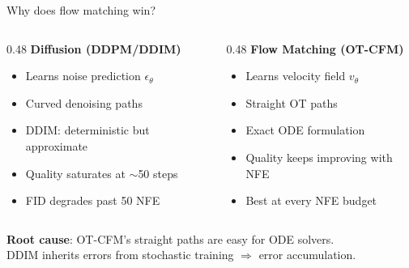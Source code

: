 \documentclass[aspectratio=169,10pt]{beamer}
\begin{document}
\begin{frame}{Why does flow matching win?}
\begin{columns}[T]
\begin{column}{0.48\textwidth}
\textbf{\textcolor{ddpmred}{Diffusion (DDPM/DDIM)}}
\begin{itemize}
    \item Learns noise prediction $\epsilon_\theta$
    \item Curved denoising paths
    \item DDIM: deterministic but approximate
    \item Quality saturates at $\sim$50 steps
    \item \alert{FID degrades past 50 NFE}
\end{itemize}
\end{column}
\begin{column}{0.48\textwidth}
\textbf{\textcolor{cfmblue}{Flow Matching (OT-CFM)}}
\begin{itemize}
    \item Learns velocity field $v_\theta$
    \item \textcolor{cfmblue}{Straight OT paths}
    \item Exact ODE formulation
    \item Quality \textcolor{accentgreen}{keeps improving} with NFE
    \item \textcolor{accentgreen}{Best at every NFE budget}
\end{itemize}
\end{column}
\end{columns}

\vspace{1em}
\centering
\textbf{Root cause}: OT-CFM's straight paths are easy for ODE solvers.\\
DDIM inherits errors from stochastic training $\Rightarrow$ error accumulation.
\end{frame}
\end{document}
